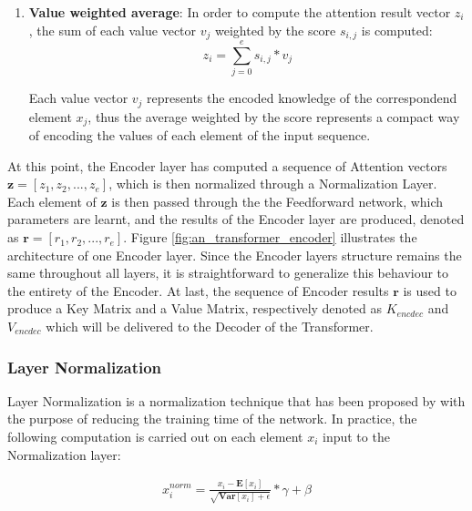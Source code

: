 \begin{enumerate}
                    \item \textbf{Value weighted average}: In order to compute the attention result vector $z_i$, the sum of each value vector $v_j$ weighted by the score $s_{i,j}$ is computed:
                    \[ z_i = \sum_{j=0}^e s_{i,j} * v_j \]
                    
                    Each value vector $v_j$ represents the encoded knowledge of the correspondend element $x_j$, thus the average weighted by the score represents a compact way of encoding the values of each element of the input sequence.
                    
                \end{enumerate}
                \noindent
                At this point, the Encoder layer has computed a sequence of Attention vectors $\mathbf{z} = [z_1, z_2, ..., z_e]$, which is then normalized through a Normalization Layer. Each element of $\mathbf{z}$ is then passed through the the Feedforward network, which parameters are learnt, and the results of the Encoder layer are produced, denoted as $\mathbf{r} = [r_1, r_2, ..., r_e]$. Figure \ref{fig:an_transformer_encoder} illustrates the architecture of one Encoder layer. Since the Encoder layers structure remains the same throughout all layers, it is straightforward to generalize this behaviour to the entirety of the Encoder. At last, the sequence of Encoder results $\mathbf{r}$ is used to produce a Key Matrix and a Value Matrix, respectively denoted as $K_{encdec}$ and $V_{encdec}$ which will be delivered to the Decoder of the Transformer.
            
            \subsubsection{Layer Normalization}
                Layer Normalization is a normalization technique that has been proposed by  with the purpose of reducing the training time of the network. In practice, the following computation is carried out on each element $x_{i}$ input to the Normalization layer:
                
                \begin{align}
                \label{eq:layer_norm}
                    x^{norm}_{i} = \frac{x_{i} - \mathbf{E} \left[ x_{i} \right]}{\sqrt{\mathbf{Var} \left[ x_{i} \right] + \epsilon}} * \gamma + \beta
                \end{align}
                
